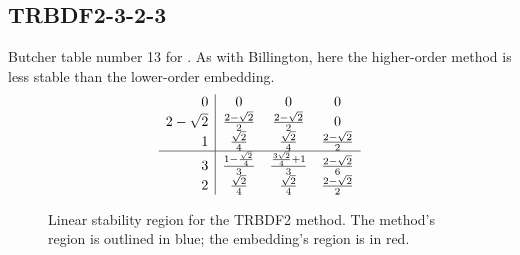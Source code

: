 \documentclass[letterpaper,10pt,english]{sphinxmanual}
\begin{document}
\subsection{TRBDF2-3-2-3}
\label{Butcher:trbdf2-3-2-3}\label{Butcher:butcher-trbdf2}
Butcher table number 13
for {\hyperref[c_interface/User_callable:ARKodeSetIRKTableNum]{}}.  As with
Billington, here the higher-order method is less stable than the
lower-order embedding.
\begin{gather}
\begin{split}\begin{array}{r|ccc}
  0 & 0 & 0 & 0 \\
  2-\sqrt{2} & \frac{2-\sqrt{2}}{2} & \frac{2-\sqrt{2}}{2} & 0 \\
  1 & \frac{\sqrt{2}}{4} & \frac{\sqrt{2}}{4} & \frac{2-\sqrt{2}}{2} \\
  \hline
  3 & \frac{1-\frac{\sqrt{2}}{4}}{3} & \frac{\frac{3\sqrt{2}}{4}+1}{3} & \frac{2-\sqrt{2}}{6} \\
  2 & \frac{\sqrt{2}}{4} & \frac{\sqrt{2}}{4} & \frac{2-\sqrt{2}}{2}
\end{array}\end{split}\notag
\end{gather}\begin{figure}[htbp]
\centering
\capstart

\caption{Linear stability region for the TRBDF2 method.  The method's
region is outlined in blue; the embedding's region is in red.}\end{figure}
\end{document}
